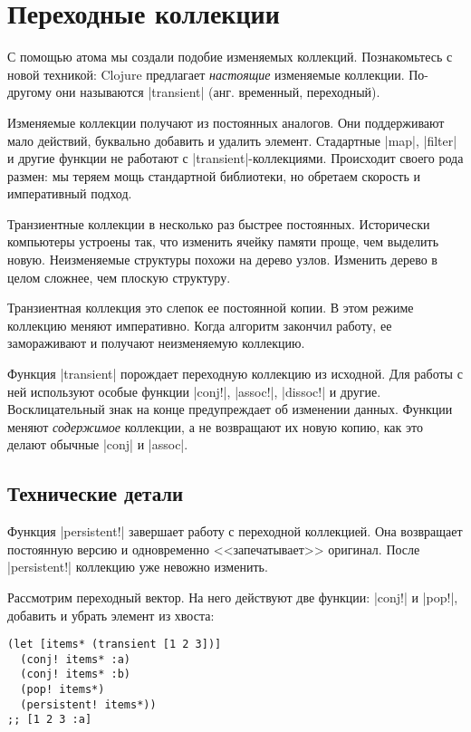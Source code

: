 \section{Переходные коллекции}

С помощью атома мы создали подобие изменяемых коллекций. Познакомьтесь с новой
техникой: Clojure предлагает \emph{настоящие} изменяемые коллекции. По-другому
они называются \spverb|transient| (анг. временный, переходный).

Изменяемые коллекции получают из постоянных аналогов. Они поддерживают мало
действий, буквально добавить и удалить элемент. Стадартные \spverb|map|,
\spverb|filter| и другие функции не работают с
\spverb|transient|-коллекциями. Происходит своего рода размен: мы теряем мощь
стандартной библиотеки, но обретаем скорость и императивный подход.

Транзиентные коллекции в несколько раз быстрее постоянных. Исторически
компьютеры устроены так, что изменить ячейку памяти проще, чем выделить
новую. Неизменяемые структуры похожи на дерево узлов. Изменить дерево в целом
сложнее, чем плоскую структуру.

Транзиентная коллекция это слепок ее постоянной копии. В этом режиме коллекцию
меняют императивно. Когда алгоритм закончил работу, ее замораживают и получают
неизменяемую коллекцию.

Функция \spverb|transient| порождает переходную коллекцию из исходной. Для
работы с ней используют особые функции \spverb|conj!|, \spverb|assoc!|,
\spverb|dissoc!| и другие. Восклицательный знак на конце предупреждает об
изменении данных. Функции меняют \emph{содержимое} коллекции, а не возвращают их
новую копию, как это делают обычные \spverb|conj| и \spverb|assoc|.

\subsection{Технические детали}

Функция \spverb|persistent!| завершает работу с переходной коллекцией. Она
возвращает постоянную версию и одновременно <<запечатывает>> оригинал. После
\spverb|persistent!| коллекцию уже невожно изменить.

Рассмотрим переходный вектор. На него действуют две функции: \spverb|conj!| и
\spverb|pop!|, добавить и убрать элемент из хвоста:

\begin{verbatim}
(let [items* (transient [1 2 3])]
  (conj! items* :a)
  (conj! items* :b)
  (pop! items*)
  (persistent! items*))
;; [1 2 3 :a]
\end{verbatim}

